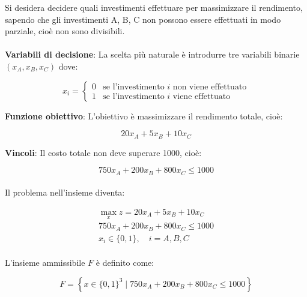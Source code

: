 \documentclass[a4paper, 11pt]{article}
\begin{document}
        Si desidera decidere quali investimenti effettuare per massimizzare il rendimento, sapendo che gli investimenti A, B, C non possono essere effettuati in modo parziale, cioè non sono divisibili.


        \paragraph{}
        \textbf{Variabili di decisione}: La scelta più naturale è introdurre tre variabili binarie $(x_A, x_B, x_C)$ dove:

        \[
            x_i = 
            \begin{cases} 
                0 & \text{se l'investimento } i \text{ non viene effettuato} \\
                1 & \text{se l'investimento } i \text{ viene effettuato}
            \end{cases}
        \]

        \textbf{Funzione obiettivo}: L'obiettivo è massimizzare il rendimento totale, cioè:

        \[
            20x_A+5x_B+10x_C
        \]

        \textbf{Vincoli}: Il costo totale non deve superare 1000, cioè:

        \[
            750x_A+200x_B+800x_C \le 1000
        \]

        \paragraph{}
        Il problema nell'insieme diventa:

        \begin{align*}
            \max_{x} z = 20x_A + 5x_B + 10x_C \\
            750x_A+200x_B+800x_C \le 1000 \\
            x_i \in \{0, 1\}, \quad i = A, B, C
        \end{align*}
           
        \paragraph{}
        L'insieme ammissibile \( F \) è definito come:

        \[
            F = \left\{ x \in \{0, 1\}^3 \mid 750x_A + 200x_B + 800x_C \leq 1000 \right\}
        \]
            
\end{document}
